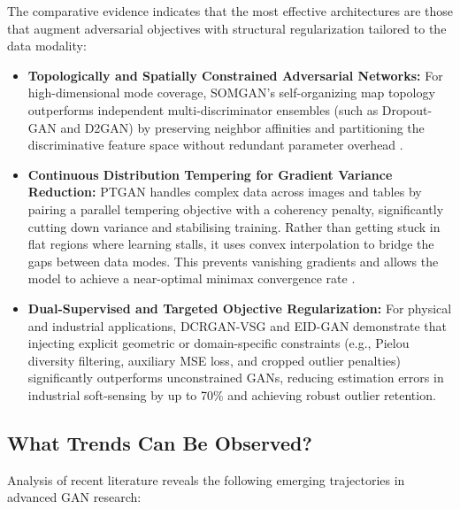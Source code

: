 \documentclass[12pt,a4paper]{article}
\begin{document}
The comparative evidence indicates that the most effective architectures are those that augment adversarial objectives with structural regularization tailored to the data modality:

\begin{itemize}
    \item \textbf{Topologically and Spatially Constrained Adversarial Networks:} For high-dimensional mode coverage, SOMGAN's self-organizing map topology outperforms independent multi-discriminator ensembles (such as Dropout-GAN and D2GAN) by preserving neighbor affinities and partitioning the discriminative feature space without redundant parameter overhead \parencite{li2024improving}.
    
    \item \textbf{Continuous Distribution Tempering for Gradient Variance Reduction:} PTGAN handles complex data across images and tables by pairing a parallel tempering objective with a coherency penalty, significantly cutting down variance and stabilising training. Rather than getting stuck in flat regions where learning stalls, it uses convex interpolation to bridge the gaps between data modes. This prevents vanishing gradients and allows the model to achieve a near-optimal minimax convergence rate \parencite{sohn2026parallelly}.
    
    \item \textbf{Dual-Supervised and Targeted Objective Regularization:} For physical and industrial applications, DCRGAN-VSG \parencite{zhu2025novel} and EID-GAN \parencite{li2023eid} demonstrate that injecting explicit geometric or domain-specific constraints (e.g., Pielou diversity filtering, auxiliary MSE loss, and cropped outlier penalties) significantly outperforms unconstrained GANs, reducing estimation errors in industrial soft-sensing by up to 70\% and achieving robust outlier retention.
\end{itemize}

\subsection{What Trends Can Be Observed?}

Analysis of recent literature reveals the following emerging trajectories in advanced GAN research:
\end{document}

